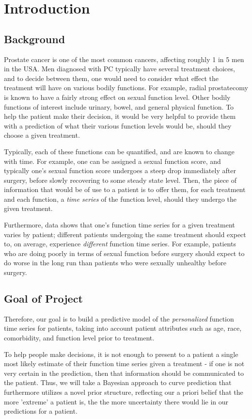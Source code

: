 \chapter{Introduction}

\section{Background}
Prostate cancer is one of the most common cancers, affecting roughly 1 in 5 men in the USA.  Men diagnosed with PC typically have several treatment choices, and to decide between them, one would need to consider what effect the treatment will have on various bodily functions.  For example, radial prostatecomy is known to have a fairly strong effect on sexual function level.  Other bodily functions of interest include urinary, bowel, and general physical function.  To help the patient make their decision, it would be very helpful to provide them with a prediction of what their various function levels would be, should they choose a given treatment.

Typically, each of these functions can be quantified, and are known to change with time.  For example, one can be assigned a sexual function score, and typically one's sexual function score undergoes a steep drop immediately after surgery, before slowly recovering to some steady state level.  Then, the piece of information that would be of use to a patient is to offer them, for each treatment and each function, a \emph{time series} of the function level, should they undergo the given treatment.

Furthermore, data shows that one's function time series for a given treatment varies by patient; different patients undergoing the same treatment should expect to, on average, experience \emph{different} function time series.  For example, patients who are doing poorly in terms of sexual function before surgery should expect to do worse in the long run than patients who were sexually unhealthy before surgery.  

\section{Goal of Project}
Therefore, our goal is to build a predictive model of the \emph{personalized} function time series for patients, taking into account patient attributes such as age, race, comorbidity, and function level prior to treatment.

To help people make decisions, it is not enough to present to a patient a single most likely estimate of their function time series given a treatment - if one is not very certain in the prediction, then that information should be communicated to the patient.  Thus, we will take a Bayesian approach to curve prediction that furthermore utilizes a novel prior structure, reflecting our a priori belief that the more 'extreme' a patient is, the the more uncertainty there would lie in our predictions for a patient.

